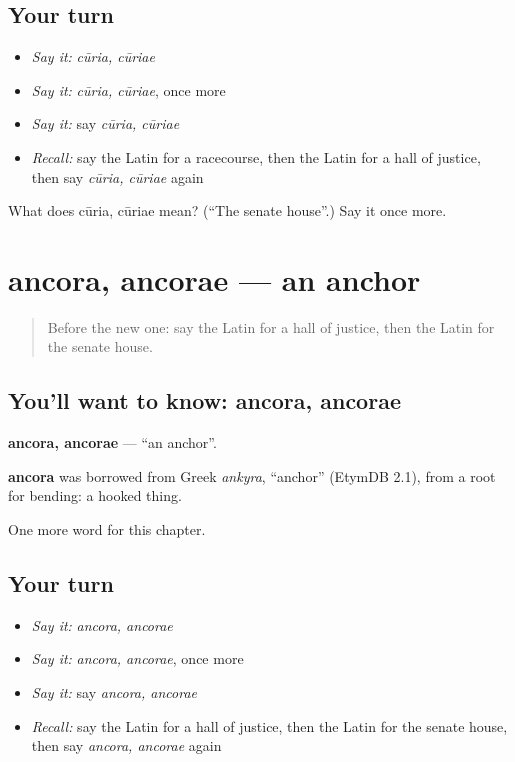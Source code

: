 \subsection*{Your turn}
\begin{itemize}
\raggedright
  \item \emph{Say it:} \emph{cūria, cūriae}
  \item \emph{Say it:} \emph{cūria, cūriae}, once more
  \item \emph{Say it:} say \emph{cūria, cūriae}
  \item \emph{Recall:} say the Latin for a racecourse, then the Latin for a hall of justice, then say \emph{cūria, cūriae} again
\end{itemize}

\begin{tcolorbox}[breakable,colback=teal!4,colframe=teal!35!black,title={Before you move on}]
What does cūria, cūriae mean? (\textquotedblleft{}The senate house\textquotedblright{}.) Say it once more.
\end{tcolorbox}
\section[ancora, ancorae]{ancora, ancorae — an anchor}

\label{lesson:LA-C270-ancora}



\begin{quote}
Before the new one: say the Latin for a hall of justice, then the Latin for the senate house.
\end{quote}

\subsection*{You'll want to know: ancora, ancorae}
\textbf{ancora, ancorae} — \textquotedblleft{}an anchor\textquotedblright{}.

\begin{cousinweb}
\textbf{ancora} was borrowed from Greek \emph{ankyra}, \textquotedblleft{}anchor\textquotedblright{} (EtymDB 2.1), from a root for bending: a hooked thing.
\end{cousinweb}

\begin{grammarlens}[title={What you've built}]
One more word for this chapter.
\end{grammarlens}

\subsection*{Your turn}
\begin{itemize}
\raggedright
  \item \emph{Say it:} \emph{ancora, ancorae}
  \item \emph{Say it:} \emph{ancora, ancorae}, once more
  \item \emph{Say it:} say \emph{ancora, ancorae}
  \item \emph{Recall:} say the Latin for a hall of justice, then the Latin for the senate house, then say \emph{ancora, ancorae} again
\end{itemize}

